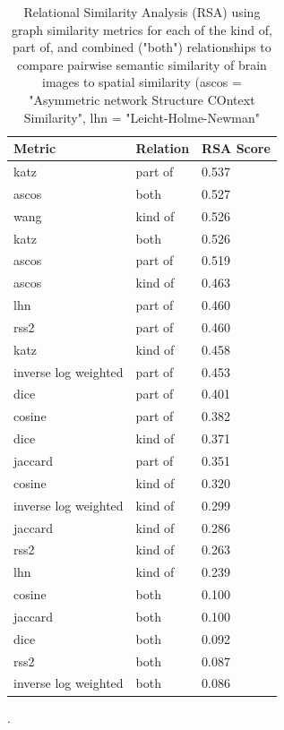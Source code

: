 \documentclass{report}
\begin{document}
\begin{table}[ht!]
\centering
\begin{tabular}{ | l | l | l |}
    \hline
    \textbf{Metric} & \textbf{Relation} & \textbf{RSA Score} \\ \hline
    katz  & part of & 0.537 \\ \hline
    ascos &  both & 0.527 \\ \hline
    wang &  kind of &  0.526 \\ \hline
    katz &  both &  0.526 \\ \hline
    ascos & part of	& 0.519 \\ \hline
    ascos & kind of	& 0.463 \\ \hline
    lhn & part of & 0.460 \\ \hline
    rss2 & part of & 0.460 \\ \hline
    katz & kind of &  0.458 \\ \hline
    inverse log weighted & part of	&  0.453 \\ \hline
    dice & part of & 0.401 \\ \hline
    cosine & part of & 0.382 \\ \hline
    dice & kind of & 0.371 \\ \hline
    jaccard & part of & 0.351 \\ \hline
    cosine & kind of & 0.320 \\ \hline
    inverse log weighted & kind of & 0.299 \\ \hline
    jaccard	& kind of & 0.286 \\ \hline
    rss2 & kind of & 0.263 \\ \hline
    lhn & kind of & 0.239 \\ \hline
    cosine & both & 0.100 \\ \hline
    jaccard	& both & 0.100 \\ \hline
    dice & both & 0.092 \\ \hline
    rss2 & both & 0.087 \\ \hline
    inverse log weighted & both & 0.086 \\ \hline
\end {tabular}\par
\bigskip
\caption{\label{table:table31} Relational Similarity Analysis (RSA) using graph similarity metrics for each of the kind of, part of, and combined ("both") relationships to compare pairwise semantic similarity of brain images to spatial similarity (ascos = "Asymmetric network Structure COntext Similarity", lhn = "Leicht-Holme-Newman"}.
\end{table}
\end{document}
